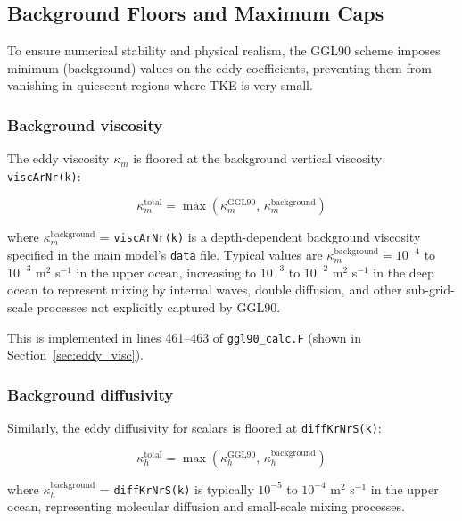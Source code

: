 \documentclass[12pt,letterpaper]{article}
\begin{document}
\subsection{Background Floors and Maximum Caps}
\label{sec:eddy_floors}

To ensure numerical stability and physical realism, the GGL90 scheme imposes minimum (background) values on the eddy coefficients, preventing them from vanishing in quiescent regions where TKE is very small.

\subsubsection{Background viscosity}

The eddy viscosity $\kappa_m$ is floored at the background vertical viscosity \verb|viscArNr(k)|:

\begin{equation}
\kappa_m^{\text{total}} = \max(\kappa_m^{\text{GGL90}}, \, \kappa_m^{\text{background}})
\label{eq:visc_floor}
\end{equation}

where $\kappa_m^{\text{background}}$ = \verb|viscArNr(k)| is a depth-dependent background viscosity specified in the main model's \verb|data| file. Typical values are $\kappa_m^{\text{background}} = 10^{-4}$ to $10^{-3}$ m$^2$ s$^{-1}$ in the upper ocean, increasing to $10^{-3}$ to $10^{-2}$ m$^2$ s$^{-1}$ in the deep ocean to represent mixing by internal waves, double diffusion, and other sub-grid-scale processes not explicitly captured by GGL90.

This is implemented in lines 461--463 of \verb|ggl90_calc.F| (shown in Section~\ref{sec:eddy_visc}).

\subsubsection{Background diffusivity}

Similarly, the eddy diffusivity for scalars is floored at \verb|diffKrNrS(k)|:

\begin{equation}
\kappa_h^{\text{total}} = \max(\kappa_h^{\text{GGL90}}, \, \kappa_h^{\text{background}})
\label{eq:diff_floor}
\end{equation}

where $\kappa_h^{\text{background}}$ = \verb|diffKrNrS(k)| is typically $10^{-5}$ to $10^{-4}$ m$^2$ s$^{-1}$ in the upper ocean, representing molecular diffusion and small-scale mixing processes.
\end{document}
